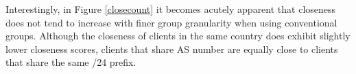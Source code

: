 Interestingly, in Figure \ref{closecount} it becomes acutely apparent that closeness does not
tend to increase with finer group granularity when using conventional groups. Although the closeness
of clients in the same country does exhibit slightly lower closeness scores, clients that share AS
number are equally close to clients that share the same /24 prefix.


